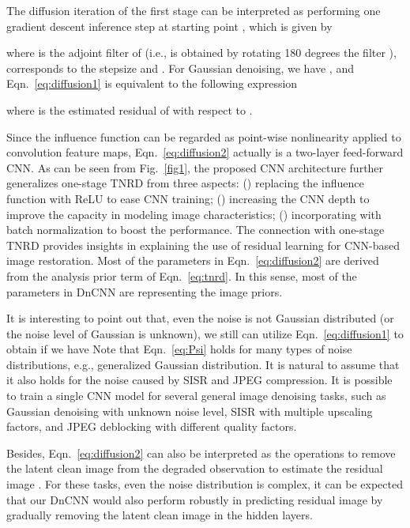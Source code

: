 \documentclass[journal]{IEEEtran}
\begin{document}
The diffusion iteration of the first stage can be interpreted as performing one gradient descent inference step at starting point , which is given by

where  is the adjoint filter of  (i.e.,  is obtained
by rotating 180 degrees the filter ),  corresponds to the stepsize and .
For Gaussian denoising, we have , and Eqn.~\eqref{eq:diffusion1} is equivalent to the following expression

where  is the estimated residual of  with respect to .

Since the influence function  can be regarded as point-wise nonlinearity applied to convolution feature maps, Eqn.~\eqref{eq:diffusion2} actually is a two-layer feed-forward CNN.
As can be seen from Fig.~\ref{fig1}, the proposed CNN architecture further generalizes one-stage TNRD from three aspects: () replacing the influence function with ReLU to ease CNN training; () increasing the CNN depth to improve the capacity in modeling image characteristics; () incorporating with batch normalization to boost the performance. The connection with one-stage TNRD provides insights in explaining the use of residual learning for CNN-based image restoration. Most of the parameters in Eqn.~\eqref{eq:diffusion2} are derived from the analysis prior term of Eqn.~\eqref{eq:tnrd}. In this sense, most of the parameters in DnCNN are representing the image priors.

It is interesting to point out that, even the noise is not Gaussian distributed (or the noise level of Gaussian is unknown), we still can utilize Eqn.~\eqref{eq:diffusion1} to obtain  if we have
  Note that Eqn.~\eqref{eq:Psi} holds for many types of noise distributions, e.g., generalized Gaussian distribution. It is natural to assume that it also holds for the noise caused by SISR and JPEG compression. It is possible to train a single CNN model for {several general image denoising tasks}, such as Gaussian denoising with unknown noise level, SISR with multiple upscaling factors, and JPEG deblocking with different quality factors.

Besides, Eqn.~\eqref{eq:diffusion2} can also be interpreted as the operations to remove the latent clean image  from the degraded observation  to estimate the residual image . For {these tasks}, even the noise distribution is complex, it can be expected that our DnCNN would also perform robustly in predicting residual image by gradually removing the latent clean image in the hidden layers.
\end{document}
